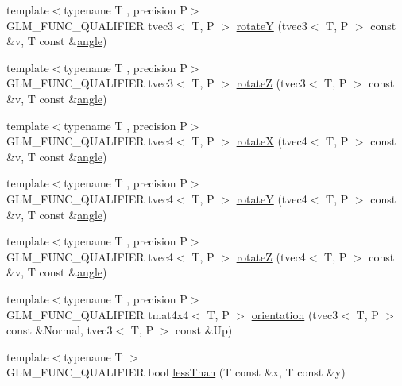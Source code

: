 \begin{DoxyCompactItemize}
\item 
{\footnotesize template$<$typename T , precision P$>$ }\\G\+L\+M\+\_\+\+F\+U\+N\+C\+\_\+\+Q\+U\+A\+L\+I\+F\+I\+E\+R tvec3$<$ T, P $>$ \hyperlink{group__gtx__rotate__vector_gabb5d19eba5befeebcb35a0aad4a114e3}{rotate\+Y} (tvec3$<$ T, P $>$ const \&v, T const \&\hyperlink{group__gtc__quaternion_gad4a4448baedb198b2b1e7880d2544dc9}{angle})
\item 
{\footnotesize template$<$typename T , precision P$>$ }\\G\+L\+M\+\_\+\+F\+U\+N\+C\+\_\+\+Q\+U\+A\+L\+I\+F\+I\+E\+R tvec3$<$ T, P $>$ \hyperlink{group__gtx__rotate__vector_gae30ac01b89d4f16a972fee696c964908}{rotate\+Z} (tvec3$<$ T, P $>$ const \&v, T const \&\hyperlink{group__gtc__quaternion_gad4a4448baedb198b2b1e7880d2544dc9}{angle})
\item 
{\footnotesize template$<$typename T , precision P$>$ }\\G\+L\+M\+\_\+\+F\+U\+N\+C\+\_\+\+Q\+U\+A\+L\+I\+F\+I\+E\+R tvec4$<$ T, P $>$ \hyperlink{group__gtx__rotate__vector_gadab312d430a564741ae02215255027a0}{rotate\+X} (tvec4$<$ T, P $>$ const \&v, T const \&\hyperlink{group__gtc__quaternion_gad4a4448baedb198b2b1e7880d2544dc9}{angle})
\item 
{\footnotesize template$<$typename T , precision P$>$ }\\G\+L\+M\+\_\+\+F\+U\+N\+C\+\_\+\+Q\+U\+A\+L\+I\+F\+I\+E\+R tvec4$<$ T, P $>$ \hyperlink{group__gtx__rotate__vector_gae2507577c4bffa3548b32852791dd90c}{rotate\+Y} (tvec4$<$ T, P $>$ const \&v, T const \&\hyperlink{group__gtc__quaternion_gad4a4448baedb198b2b1e7880d2544dc9}{angle})
\item 
{\footnotesize template$<$typename T , precision P$>$ }\\G\+L\+M\+\_\+\+F\+U\+N\+C\+\_\+\+Q\+U\+A\+L\+I\+F\+I\+E\+R tvec4$<$ T, P $>$ \hyperlink{group__gtx__rotate__vector_ga034e5d197ab4bd8685624bc2cf16e586}{rotate\+Z} (tvec4$<$ T, P $>$ const \&v, T const \&\hyperlink{group__gtc__quaternion_gad4a4448baedb198b2b1e7880d2544dc9}{angle})
\item 
{\footnotesize template$<$typename T , precision P$>$ }\\G\+L\+M\+\_\+\+F\+U\+N\+C\+\_\+\+Q\+U\+A\+L\+I\+F\+I\+E\+R tmat4x4$<$ T, P $>$ \hyperlink{group__gtx__rotate__vector_ga49b4d082305cdfcfe0a5c184f684a902}{orientation} (tvec3$<$ T, P $>$ const \&Normal, tvec3$<$ T, P $>$ const \&Up)
\item 
{\footnotesize template$<$typename T $>$ }\\G\+L\+M\+\_\+\+F\+U\+N\+C\+\_\+\+Q\+U\+A\+L\+I\+F\+I\+E\+R bool \hyperlink{namespaceglm_a6f2a3cef357dbf21b5fc90aded289ba1}{less\+Than} (T const \&x, T const \&y)

\end{DoxyCompactItemize}
